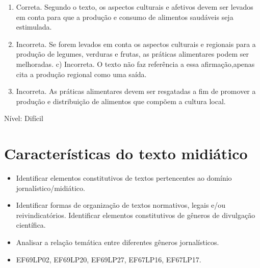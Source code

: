 \begin{enumerate}
\def\labelenumi{\arabic{enumi}.}
\item
  Correta. Segundo o texto, os aspectos culturais e afetivos devem ser
  levados em conta para que a produção e consumo de alimentos saudáveis
  seja estimulada.
\item
  Incorreta. Se forem levados em conta os aspectos culturais e regionais
  para a produção de legumes, verduras e frutas, as práticas alimentares
  podem ser melhoradas. c) Incorreta. O texto não faz referência a essa
  afirmação,apenas cita a produção regional como uma saída.
\item
  Incorreta. As práticas alimentares devem ser resgatadas a fim de
  promover a produção e distribuição de alimentos que compõem a cultura
  local.
\end{enumerate}

Nível: Difícil

\chapter{Características do texto midiático}


\begin{itemize}

  \item Identificar elementos constitutivos de textos pertencentes ao
domínio jornalístico/midiático.

  \item Identificar formas de organização de textos normativos, legais e/ou
reivindicatórios. Identificar elementos constitutivos de gêneros de
divulgação científica.

  \item Analisar a relação temática entre diferentes gêneros jornalísticos.

\end{itemize}


\begin{itemize}
  
  \item EF69LP02, EF69LP20, EF69LP27, EF67LP16, EF67LP17.

\end{itemize}

